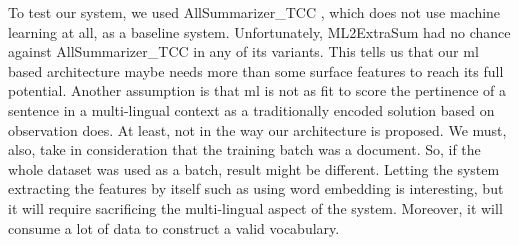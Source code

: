 To test our system, we used AllSummarizer\_TCC \citep{13-aries-al,15-aries-al}, which does not use machine learning at all, as a baseline system. 
Unfortunately, ML2ExtraSum had no chance against AllSummarizer\_TCC in any of its variants. 
This tells us that our \ac{ml} based architecture maybe needs more than some surface features to reach its full potential. 
Another assumption is that \ac{ml} is not as fit to score the pertinence of a sentence in a multi-lingual context as a traditionally encoded solution based on observation does. 
At least, not in the way our architecture is proposed. 
We must, also, take in consideration that the training batch was a document. 
So, if the whole dataset was used as a batch, result might be different.
Letting the system extracting the features by itself such as using word embedding is interesting, but it will require sacrificing the multi-lingual aspect of the system. 
Moreover, it will consume a lot of data to construct a valid vocabulary. 






